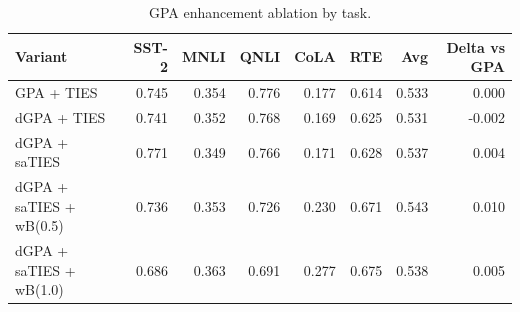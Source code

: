 \begin{table}[htbp]
\centering
\caption{GPA enhancement ablation by task.}
\label{tab:enhancement-ablation}
\begin{tabular}{lrrrrrrr}
\toprule
Variant & SST-2 & MNLI & QNLI & CoLA & RTE & Avg & Delta vs GPA \\
\midrule
GPA + TIES & 0.745 & 0.354 & 0.776 & 0.177 & 0.614 & 0.533 & 0.000 \\
dGPA + TIES & 0.741 & 0.352 & 0.768 & 0.169 & 0.625 & 0.531 & -0.002 \\
dGPA + saTIES & 0.771 & 0.349 & 0.766 & 0.171 & 0.628 & 0.537 & 0.004 \\
dGPA + saTIES + wB(0.5) & 0.736 & 0.353 & 0.726 & 0.230 & 0.671 & 0.543 & 0.010 \\
dGPA + saTIES + wB(1.0) & 0.686 & 0.363 & 0.691 & 0.277 & 0.675 & 0.538 & 0.005 \\
\bottomrule
\end{tabular}
\end{table}
